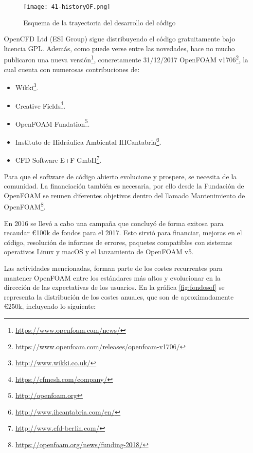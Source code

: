 \begin{figure}
\centering
\texttt{[image: 41-historyOF.png]}
\caption[Esquema de la trayectoria del desarrollo del código]{Esquema de la trayectoria del desarrollo del código}
\label{fig:historyOF}
\end{figure}

OpenCFD Ltd (ESI Group) sigue distribuyendo el código gratuitamente bajo
licencia GPL. Además, como puede verse entre las novedades, hace no
mucho publicaron una nueva versión\footnote{
\url{https://www.openfoam.com/news/}}, concretamente 31/12/2017
OpenFOAM v1706\footnote{\url{https://www.openfoam.com/releases/openfoam-v1706/}}, la cual cuenta con numerosas contribuciones de:

\begin{itemize}
\item
  Wikki\footnote{\url{http://www.wikki.co.uk/}}.
\item
  Creative Fields\footnote{\url{https://cfmesh.com/company/}}.
\item
  OpenFOAM Fundation\footnote{\url{http://openfoam.org}}.
\item
  Instituto de Hidráulica Ambiental IHCantabria\footnote{\url{http://www.ihcantabria.com/en/}}.
\item
  CFD Software E+F GmbH\footnote{\url{http://www.cfd-berlin.com/}}.
\end{itemize}

Para que el software de código abierto evolucione y prospere, se
necesita de la comunidad. La financiación también es necesaria, por ello
desde la Fundación de OpenFOAM se reunen diferentes objetivos dentro del
llamado Mantenimiento de
OpenFOAM\footnote{\url{https://openfoam.org/news/funding-2018/}}.

En 2016 se llevó a cabo una campaña que concluyó de forma exitosa para
recaudar \euro{}100k de fondos para el 2017. Esto sirvió para financiar,
mejoras en el código, resolución de informes de errores, paquetes
compatibles con sistemas operativos Linux y macOS y el lanzamiento de
OpenFOAM v5.

Las actividades mencionadas, forman parte de los costes recurrentes para
mantener OpenFOAM entre los estándares más altos y evolucionar en la
dirección de las expectativas de los usuarios. En la gráfica \autoref{fig:fondosof} se representa la distribución de los costes anuales, que son de
aproximadamente \euro{}250k, incluyendo lo siguiente:


